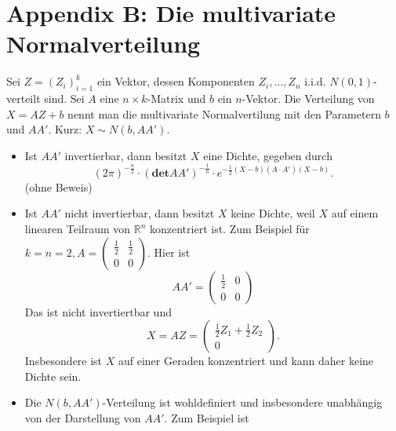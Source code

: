 \documentclass[10pt]{article}
\newcommand{\IR}{\mathbb{R}} %
\begin{document}
			
			
			
			\newpage
			\part{Appendix B: Die multivariate Normalverteilung}
			\begin{Definition}
				Sei $Z = (Z_i)^k_{i=1}$ ein Vektor, dessen Komponenten $Z_i, \ldots, Z_n$ i.i.d. $N(0,1)$-verteilt sind. Sei $A$ eine $n \times k$-Matrix und $b$ ein $n$-Vektor. Die Verteilung von $X = AZ+b$ nennt man die multivariate Normalvertilung mit den Parametern $b$ und $AA'$. Kurz: $X \sim N(b,AA')$.
			\end{Definition}
			\begin{Bemerkung}
				\begin{itemize}
					\item Ist $AA'$ invertierbar, dann besitzt $X$ eine Dichte, gegeben durch 
					\begin{equation*}
						(2 \pi)^{-\frac{n}{2}} \cdot(\textbf{det}AA')^{-\frac{1}{n}} \cdot e ^{- \frac{1}{2} (X-b)(A\cdot A')(X-b)}.
					\end{equation*}
					(ohne Beweis)
					\item Ist $AA'$ nicht invertierbar, dann besitzt $X$ keine Dichte, weil $X$ auf einem linearen Teilraum von $\IR^n$ konzentriert ist. Zum Beispiel für $k=n=2, A=\begin{pmatrix}
						\frac{1}{2} & \frac{1}{2}\\
						0 &  0 
					\end{pmatrix}$. Hier ist 
					\begin{equation*}
						AA' = \begin{pmatrix}
							\frac{1}{2} & 0 \\ 0&0
						\end{pmatrix}
					\end{equation*}
					Das ist nicht invertiertbar und 
					\begin{equation*}
						X = AZ = \begin{pmatrix}
							\frac{1}{2} Z_1 + \frac{1}{2}Z_2\\
							0
						\end{pmatrix}.
					\end{equation*}
					Insbesondere ist $X$ auf einer Geraden konzentriert und kann daher keine Dichte sein. 
					\item Die $N(b,AA')$-Verteilung ist wohldefiniert und insbesondere unabhängig von der Darstellung von $AA'$. Zum Beispiel ist 

\end{itemize}
\end{Bemerkung}
\end{document}
